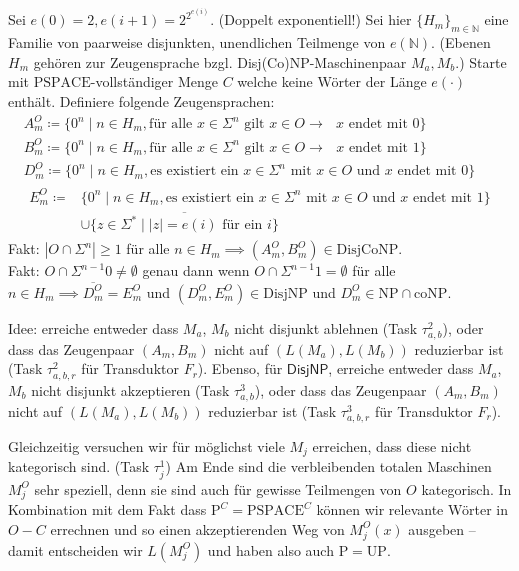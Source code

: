 \documentclass[nofonts]{uebung}
\theoremstyle{definition}
\def\P{\ensuremath{\mathrm{P}}}
\def\NP{\ensuremath{\mathrm{NP}}}
\def\UP{\ensuremath{\mathrm{UP}}}
\def\DisjNP{\ensuremath{\mathrm{DisjNP}}}
\def\DisjCoNP{\ensuremath{\mathrm{DisjCoNP}}}
\def\coNP{\ensuremath{\mathrm{coNP}}}
\def\hDisjNP{\ensuremath{\mathsf{DisjNP}}}
\begin{document}
Sei $e(0)=2, e(i+1)=2^{2^{e(i)}}$. (Doppelt exponentiell!) Sei hier $\{H_m\}_{m\in\mathbb N}$ eine Familie von paarweise disjunkten, unendlichen Teilmenge von $e(\mathbb N)$. (Ebenen $H_m$ gehören zur Zeugensprache bzgl. Disj(Co)NP-Maschinenpaar $M_a, M_b$.)
Starte mit $\mathrm{PSPACE}$-vollständiger Menge $C$ welche keine Wörter der Länge $e(\cdot)$ enthält.
Definiere folgende Zeugensprachen:
\begin{gather*}
    A_m^O \coloneqq \{ 0^n \mid n\in H_m, \text{für alle $x\in \Sigma^{n}$ gilt } x\in O \rightarrow \text{ $x$ endet mit $0$} \}\\
    B_m^O \coloneqq \{ 0^n \mid n\in H_m, \text{für alle $x\in \Sigma^{n}$ gilt } x\in O \rightarrow \text{ $x$ endet mit $1$} \}\\
    D_m^O \coloneqq \{ 0^n \mid n\in H_m, \text{es existiert ein $x\in \Sigma^{n}$ mit $x\in O$ und $x$ endet mit $0$} \}\\
    \begin{split} E_m^O \coloneqq &\{ 0^n \mid n\in H_m, \text{es existiert ein $x\in \Sigma^{n}$ mit $x\in O$ und $x$ endet mit $1$} \} \\ &\cup \overline{\{ z\in\Sigma^* \mid |z|=e(i) \text{ für ein $i$} \}} \end{split}
\end{gather*}
Fakt: $|O\cap \Sigma^n|\geq 1$ für alle $n\in H_m \implies (A_m^O, B_m^O)\in\DisjCoNP$.\\
Fakt: $O\cap \Sigma^{n-1}0\neq\emptyset$ genau dann wenn  $O\cap \Sigma^{n-1}1=\emptyset$ für alle $n\in H_m \implies \overline{D_m^O}=E_m^O$ und $(D_m^O, E_m^O)\in\DisjNP$ und $D_m^O\in\NP\cap\coNP$.
\medskip

Idee: erreiche entweder dass $M_a$, $M_b$ nicht disjunkt ablehnen (Task $\tau^2_{a,b}$), oder dass das Zeugenpaar $(A_m,B_m)$ nicht auf $(L(M_a),L(M_b))$ reduzierbar ist (Task $\tau^2_{a,b,r}$ für Transduktor $F_r$).
Ebenso, für $\hDisjNP$, erreiche entweder dass $M_a$, $M_b$ nicht disjunkt akzeptieren (Task $\tau^3_{a,b}$), oder dass das Zeugenpaar $(A_m,B_m)$ nicht auf $(L(M_a),L(M_b))$ reduzierbar ist (Task $\tau^3_{a,b,r}$ für Transduktor $F_r$).

Gleichzeitig versuchen wir für möglichst viele $M_j$ erreichen, dass diese nicht kategorisch sind. (Task $\tau^1_j$)
Am Ende sind die verbleibenden totalen Maschinen $M^O_j$ sehr speziell, denn sie sind auch für gewisse Teilmengen von $O$ kategorisch.
In Kombination mit dem Fakt dass $\P^C=\mathrm{PSPACE}^C$ können wir relevante Wörter in $O-C$ errechnen und so einen akzeptierenden Weg von $M^O_j(x)$ ausgeben -- damit entscheiden wir $L(M^O_j)$ und haben also auch $\P=\UP$.
\medskip
\end{document}
